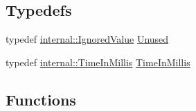 \subsection*{Typedefs}
\begin{DoxyCompactItemize}
\item 
typedef \hyperlink{classtesting_1_1internal_1_1IgnoredValue}{internal\+::\+Ignored\+Value} \hyperlink{namespacetesting_a603e329ec0263ebfcf16f712810bd511}{Unused}
\item 
typedef \hyperlink{namespacetesting_1_1internal_a66a845df404b38fe85c5e14a069f255a}{internal\+::\+Time\+In\+Millis} \hyperlink{namespacetesting_a992de1d091ce660f451d1e8b3ce30fd6}{Time\+In\+Millis}
\end{DoxyCompactItemize}
\subsection*{Functions}
